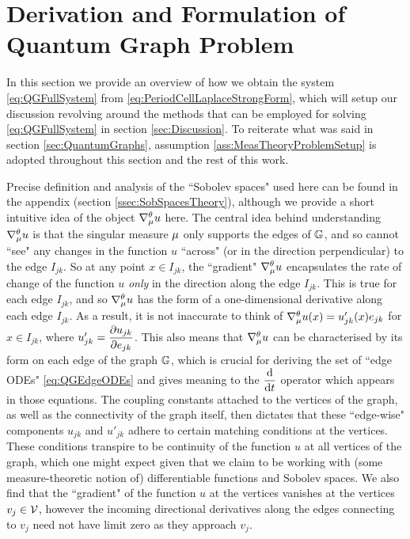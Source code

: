 \section{Derivation and Formulation of Quantum Graph Problem} \label{sec:SystemDerivation}

In this section we provide an overview of how we obtain the system \eqref{eq:QGFullSystem} from \eqref{eq:PeriodCellLaplaceStrongForm}, which will setup our discussion revolving around the methods that can be employed for solving \eqref{eq:QGFullSystem} in section \ref{sec:Discussion}.
To reiterate what was said in section \ref{sec:QuantumGraphs}, assumption \ref{ass:MeasTheoryProblemSetup} is adopted throughout this section and the rest of this work. \newline

Precise definition and analysis of the ``Sobolev spaces" used here can be found in the appendix (section \ref{ssec:SobSpacesTheory}), although we provide a short intuitive idea of the object $\nabla^{\theta}_{\mu}u$ here.
The central idea behind understanding $\nabla^{\theta}_{\mu}u$ is that the singular measure $\mu$ only supports the edges of $\mathbb{G}$, and so cannot ``see" any changes in the function $u$ ``across" (or in the direction perpendicular) to the edge $I_{jk}$.
So at any point $x\in I_{jk}$, the ``gradient" $\nabla^{\theta}_{\mu}u$ encapsulates the rate of change of the function $u$ \emph{only} in the direction along the edge $I_{jk}$.
This is true for each edge $I_{jk}$, and so $\nabla^{\theta}_{\mu}u$ has the form of a one-dimensional derivative along each edge $I_{jk}$.
As a result, it is not inaccurate to think of $\nabla^{\theta}_{\mu}u(x) = u_{jk}'(x)e_{jk}$ for $x\in I_{jk}$, where $u_{jk}' = \dfrac{\partial u_{jk}}{\partial e_{jk}}$.
This also means that $\nabla^{\theta}_{\mu}u$ can be characterised by its form on each edge of the graph $\mathbb{G}$, which is crucial for deriving the set of ``edge ODEs" \eqref{eq:QGEdgeODEs} and gives meaning to the $\dfrac{\mathrm{d}}{\mathrm{d}t}$ operator which appears in those equations.
The coupling constants attached to the vertices of the graph, as well as the connectivity of the graph itself, then dictates that these ``edge-wise" components $u_{jk}$ and $u'_{jk}$ adhere to certain matching conditions at the vertices.
These conditions transpire to be continuity of the function $u$ at all vertices of the graph, which one might expect given that we claim to be working with (some measure-theoretic notion of) differentiable functions and Sobolev spaces.
We also find that the ``gradient" of the function $u$ at the vertices vanishes at the vertices $v_j\in\mathcal{V}$, however the incoming directional derivatives along the edges connecting to $v_j$ need not have limit zero as they approach $v_j$.
